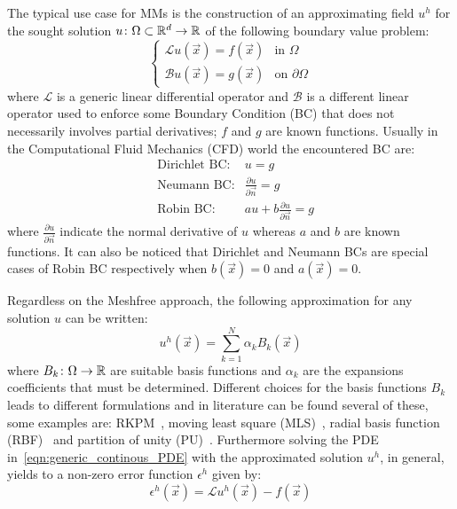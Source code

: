 The typical use case for MMs is the construction of an approximating field $u^{h}$ for the sought solution $u\colon\Omega\subset \mathbb{R}^{d}\to\mathbb{R}$ of the following boundary value problem:
\begin{equation}
	\label{eqn:generic_continous_PDE}
	\begin{cases}
		\mathcal{L} u(\vec{x})  = f(\vec{x})		& \text{in $\Omega$} \\
		\mathcal{B} u(\vec{x})   = g(\vec{x})	     & \text{on $\partial\Omega$}
	\end{cases}
\end{equation}
where $\mathcal{L}$ is a generic linear differential operator and $\mathcal{B}$ is a different linear operator used to enforce some Boundary Condition (BC) that does not necessarily involves partial derivatives; $f$ and $g$ are known functions.
Usually in the Computational Fluid Mechanics (CFD) world the encountered BC are:
\begin{align}
	& \text{Dirichlet BC:} & u=g  \\
	& \text{Neumann BC:} & \frac{\partial u}{\partial \vec{n}} = g  \\
	& \text{Robin BC:} & au + b\frac{\partial u}{\partial \vec{n}} = g
\end{align}
where $\frac{\partial u}{\partial \vec{n}}$ indicate the normal derivative of $u$ whereas $a$ and $b$ are known functions. It can also be noticed that Dirichlet and Neumann BCs are special cases of Robin BC respectively when $b(\vec{x})=0$ and $a(\vec{x})=0$.

Regardless on the Meshfree approach, the following approximation for any solution $u$ can be written:
\begin{equation}
	\label{eqn:general_u_discretization}
	u^{h}(\vec{x}) = \sum_{k= 1}^{N} {\alpha_k B_k(\vec{x})}
\end{equation}
where $B_k\colon\Omega\to\mathbb{R}$ are suitable basis functions and $\alpha_k$ are the expansions coefficients that must be determined.
Different choices for the basis functions $B_k$ leads to different formulations and in literature can be found several of these, some examples are: RKPM~\cite{Liu:RKPM}, moving least square (MLS)~\cite{Lancaster:MLS}, radial basis function (RBF)~\cite{Kansa:RBF_1, Kansa:RBF_2} and partition of unity (PU)~\cite{Schweitzer:PU}. Furthermore solving the PDE in~\eqref{eqn:generic_continous_PDE} with the approximated solution $u^h$, in general, yields to a non-zero error function $\epsilon^{h}$ given by:
\begin{equation}
	\epsilon^{h}(\vec{x}) = \mathcal{L} u^{h}(\vec{x}) - f(\vec{x})
\end{equation}

